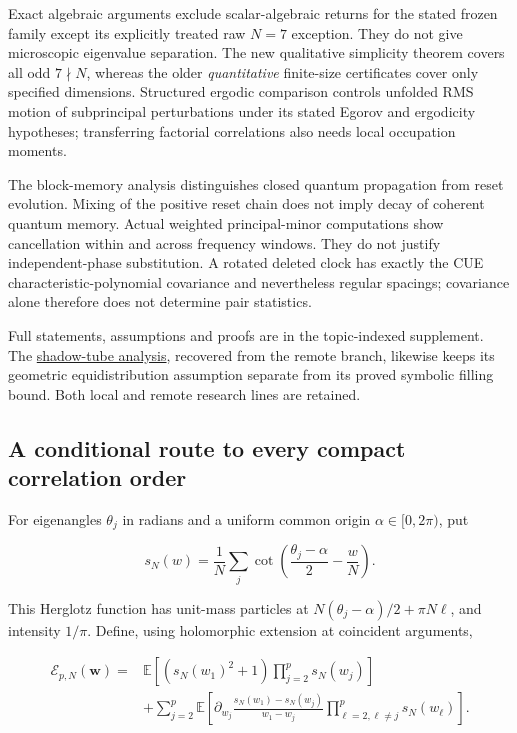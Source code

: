 Exact algebraic arguments exclude scalar-algebraic returns for the stated
frozen family except its explicitly treated raw \(N=7\) exception. They do not
give microscopic eigenvalue separation. The new qualitative simplicity
theorem covers all odd \(7\nmid N\), whereas the older \emph{quantitative}
finite-size certificates cover only specified dimensions. Structured ergodic comparison
controls unfolded RMS motion of subprincipal perturbations under its stated
Egorov and ergodicity hypotheses; transferring factorial correlations also
needs local occupation moments.

The block-memory analysis distinguishes closed quantum propagation from
reset evolution. Mixing of the positive reset chain does not imply decay
of coherent quantum memory. Actual weighted principal-minor computations
show cancellation within and across frequency windows. They do not justify
independent-phase substitution. A rotated deleted clock has exactly the
CUE characteristic-polynomial covariance and nevertheless regular spacings;
covariance alone therefore does not determine pair statistics.

Full statements, assumptions and proofs are in the topic-indexed supplement.
The \href{https://github.com/ChurilovMaksim/BGS/blob/main/mathematics/information-theory/shadow_tube_history_bridge.md}{shadow-tube analysis}, recovered from the
remote branch, likewise keeps its geometric equidistribution assumption
separate from its proved symbolic filling bound. Both local and remote
research lines are retained.

\hypertarget{a-conditional-route-to-every-compact-correlation-order}{%
\subsection{A conditional route to every compact correlation order}\label{a-conditional-route-to-every-compact-correlation-order}}

For eigenangles \(\theta_j\) in radians and a uniform common origin
\(\alpha\in[0,2\pi)\), put

\[
s_N(w)=\frac1N\sum_j\cot\left(\frac{\theta_j-\alpha}{2}-\frac wN\right).
\]

This Herglotz function has unit-mass particles at
\(N(\theta_j-\alpha)/2+\pi N\ell\), and intensity \(1/\pi\).
Define, using holomorphic extension at coincident arguments,

\[
\begin{split}
\mathcal E_{p,N}(\mathbf w)={}&
\mathbb E[(s_N(w_1)^2+1)\prod_{j=2}^p s_N(w_j)]\\
&+\sum_{j=2}^p\mathbb E\left[
\partial_{w_j}\frac{s_N(w_1)-s_N(w_j)}{w_1-w_j}
\prod_{\ell=2,\ell\ne j}^p s_N(w_\ell)\right].
\end{split}
\]

